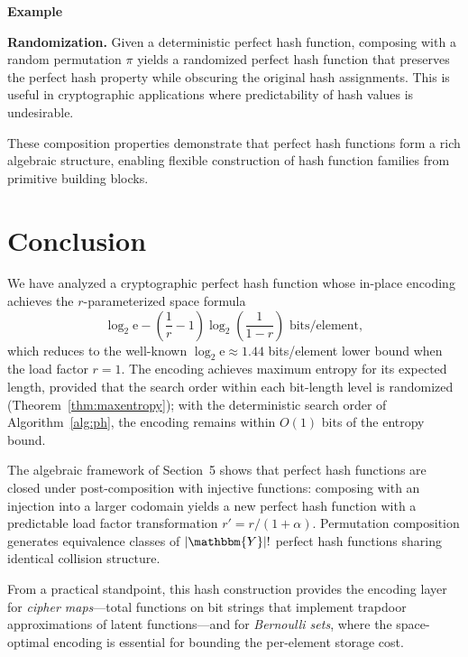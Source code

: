 \documentclass[hidelinks,11pt,final]{article}
\theoremstyle{plain}
\newcounter{examplecounter}
\newenvironment{example}
{
    \refstepcounter{examplecounter}%
    \par\vspace{\baselineskip}\noindent 
    \textbf{Example \theexamplecounter}%
    \begin{itshape}
    \quad
}
{
    \end{itshape}
    \par\vspace{\baselineskip}%
    \noindent\ignorespacesafterend     
}
\begin{document}
\begin{example}
\textbf{Randomization.} Given a deterministic perfect hash function, composing with a random permutation $\pi$ yields a randomized perfect hash function that preserves the perfect hash property while obscuring the original hash assignments. This is useful in cryptographic applications where predictability of hash values is undesirable.
\end{example}

These composition properties demonstrate that perfect hash functions form a rich algebraic structure, enabling flexible construction of hash function families from primitive building blocks.


\section{Conclusion}
We have analyzed a cryptographic perfect hash function whose in-place encoding achieves the $r$-parameterized space formula
\begin{equation}
    \log_2 \mathrm{e} - \left(\frac{1}{r} - 1\right) \log_2\!\left(\frac{1}{1-r}\right) \text{ bits/element},
\end{equation}
which reduces to the well-known $\log_2 \mathrm{e} \approx 1.44$ bits/element lower bound when the load factor $r = 1$.
The encoding achieves maximum entropy for its expected length, provided that the search order within each bit-length level is randomized (Theorem~\ref{thm:maxentropy}); with the deterministic search order of Algorithm~\ref{alg:ph}, the encoding remains within $O(1)$ bits of the entropy bound.

The algebraic framework of Section~5 shows that perfect hash functions are closed under post-composition with injective functions: composing with an injection into a larger codomain yields a new perfect hash function with a predictable load factor transformation $r' = r/(1+\alpha)$.
Permutation composition generates equivalence classes of $|\mathbbm{Y}|!$ perfect hash functions sharing identical collision structure.

From a practical standpoint, this hash construction provides the encoding layer for \emph{cipher maps}---total functions on bit strings that implement trapdoor approximations of latent functions---and for \emph{Bernoulli sets}, where the space-optimal encoding is essential for bounding the per-element storage cost.
\end{document}
